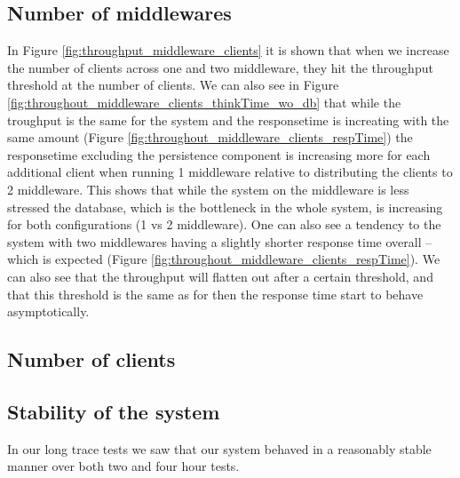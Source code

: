 \documentclass{article}
\begin{document}
\begin{table}
\begin{table}
\begin{table}
        \subsection{Number of middlewares}
		   In Figure \ref{fig:throughput_middleware_clients} it is shown that when we increase the number of clients across one and two middleware, they hit the throughput threshold at the number of clients. We can also see in Figure \ref{fig:throughout_middleware_clients_thinkTime_wo_db} that while the troughput is the same for the system and the responsetime is increating with the same amount (Figure \ref{fig:throughout_middleware_clients_respTime}) the responsetime excluding the persistence component is increasing more for each additional client when running 1 middleware relative to distributing the clients to 2 middleware. This shows that while the system on the middleware is less stressed the database, which is the bottleneck in the whole system, is increasing for both configurations (1 vs 2 middleware). One can also see a tendency to the system with two middlewares having a slightly shorter response time overall -- which is expected (Figure \ref{fig:throughout_middleware_clients_respTime}). We can also see that the throughput will flatten out after a certain threshold, and that this threshold is the same as for then the response time start to behave asymptotically.

        \subsection{Number of clients}


        \subsection{Stability of the system}
            In our long trace tests we saw that our system behaved in a reasonably stable manner over both two and four hour tests.


\end{table}
\end{table}
\end{table}
\end{document}
